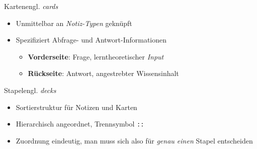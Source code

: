 \documentclass[aspectratio=169,compress]{beamer}
\begin{document}
\begin{frame}{Karten}{engl. \textit{cards}}
	\begin{itemize}
		\item Unmittelbar an \textit{Notiz-Typen} geknüpft
		\item Spezifiziert Abfrage- und Antwort-Informationen
		\begin{itemize}
			\item \textbf{Vorderseite}: Frage, lerntheoretischer \textit{Input}
			\item \textbf{Rückseite}: Antwort, angestrebter Wissensinhalt
		\end{itemize}
	\end{itemize}
\end{frame}

\begin{frame}{Stapel}{engl. \textit{decks}}
	\begin{itemize}
		\item Sortierstruktur für Notizen und Karten
		\item Hierarchisch angeordnet, Trennsymbol \texttt{::}
		\item Zuordnung eindeutig, man muss sich also für \textit{genau einen} Stapel entscheiden
	\end{itemize}
\end{frame}
\end{document}
